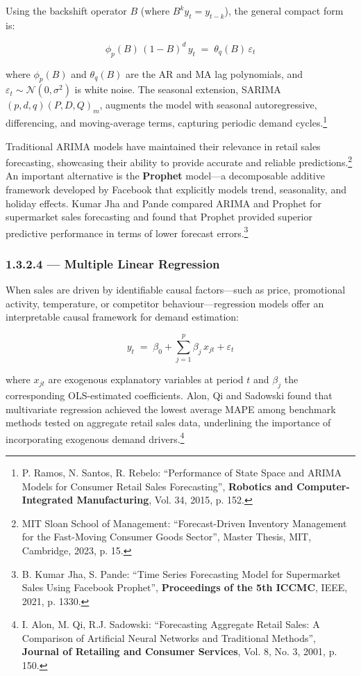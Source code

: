 Using the backshift operator $B$ (where $B^k y_t = y_{t-k}$), the general
compact form is:

\begin{equation}
  \phi_p(B)\,(1-B)^d\,y_t \;=\; \theta_q(B)\,\varepsilon_t
  \label{eq:arima}
\end{equation}

\noindent where $\phi_p(B)$ and $\theta_q(B)$ are the AR and MA lag
polynomials, and $\varepsilon_t \sim \mathcal{N}(0, \sigma^2)$ is white
noise. The seasonal extension, SARIMA$(p,d,q)(P,D,Q)_m$, augments the
model with seasonal autoregressive, differencing, and moving-average terms,
capturing periodic demand cycles.\footnote{P. Ramos, N. Santos, R. Rebelo:
``Performance of State Space and ARIMA Models for Consumer Retail Sales
Forecasting'', \textbf{Robotics and Computer-Integrated Manufacturing},
Vol. 34, 2015, p. 152.}

Traditional ARIMA models have maintained their relevance in retail sales
forecasting, showcasing their ability to provide accurate and reliable
predictions.\footnote{MIT Sloan School of Management: ``Forecast-Driven
Inventory Management for the Fast-Moving Consumer Goods Sector'', Master
Thesis, MIT, Cambridge, 2023, p. 15.} An important alternative is the
\textbf{Prophet} model—a decomposable additive framework developed by
Facebook that explicitly models trend, seasonality, and holiday effects.
Kumar Jha and Pande compared ARIMA and Prophet for supermarket sales
forecasting and found that Prophet provided superior predictive performance
in terms of lower forecast errors.\footnote{B. Kumar Jha, S. Pande: ``Time
Series Forecasting Model for Supermarket Sales Using Facebook Prophet'',
\textbf{Proceedings of the 5th ICCMC}, IEEE, 2021, p. 1330.}

\subsubsection{1.3.2.4 — Multiple Linear Regression}

When sales are driven by identifiable causal factors—such as price,
promotional activity, temperature, or competitor behaviour—regression
models offer an interpretable causal framework for demand estimation:

\begin{equation}
  y_t \;=\; \beta_0 + \sum_{j=1}^{p}\beta_j\,x_{jt} + \varepsilon_t
  \label{eq:ols}
\end{equation}

\noindent where $x_{jt}$ are exogenous explanatory variables at period $t$
and $\beta_j$ the corresponding OLS-estimated coefficients. Alon, Qi and
Sadowski found that multivariate regression achieved the lowest average MAPE
among benchmark methods tested on aggregate retail sales data, underlining
the importance of incorporating exogenous demand drivers.\footnote{I. Alon,
M. Qi, R.J. Sadowski: ``Forecasting Aggregate Retail Sales: A Comparison of
Artificial Neural Networks and Traditional Methods'', \textbf{Journal of
Retailing and Consumer Services}, Vol. 8, No. 3, 2001, p. 150.}

